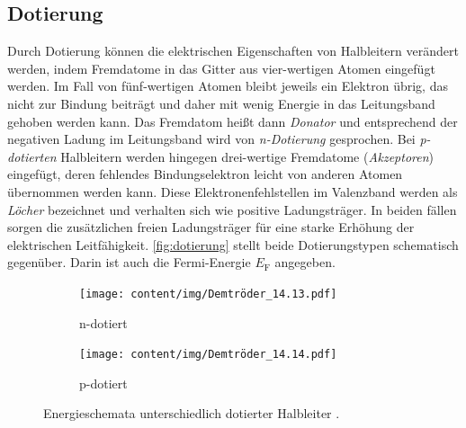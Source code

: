 \subsection{Dotierung}
Durch Dotierung können die elektrischen Eigenschaften von Halbleitern verändert werden,
indem Fremdatome in das Gitter aus vier-wertigen Atomen eingefügt werden.
Im Fall von fünf-wertigen Atomen %
bleibt jeweils ein Elektron übrig,
das nicht zur Bindung beiträgt und daher mit wenig Energie in das Leitungsband gehoben werden kann.
Das Fremdatom heißt dann \emph{Donator} und entsprechend der negativen Ladung im Leitungsband wird von \emph{n-Dotierung} gesprochen.
%
Bei \emph{p-dotierten} Halbleitern werden hingegen drei-wertige Fremdatome (\emph{Akzeptoren}) eingefügt,
deren fehlendes Bindungselektron leicht von anderen Atomen übernommen werden kann.
Diese Elektronenfehlstellen im Valenzband werden als \emph{Löcher} bezeichnet und verhalten sich wie positive Ladungsträger.
%
In beiden fällen sorgen die zusätzlichen freien Ladungsträger für eine starke Erhöhung der elektrischen Leitfähigkeit.
\autoref{fig:dotierung} stellt beide Dotierungstypen schematisch gegenüber.
Darin ist auch die Fermi-Energie $E_\text{F}$ angegeben.

\begin{figure}
    \centering
    \begin{subfigure}{0.48\textwidth}
        \centering
        \texttt{[image: content/img/Demtröder\_14.13.pdf]}
        \caption{n-dotiert}
        \label{fig:dotierung:donatoren}
    \end{subfigure}
    \hfill
    \begin{subfigure}{0.48\textwidth}
        \centering
        \texttt{[image: content/img/Demtröder\_14.14.pdf]}
        \caption{p-dotiert}
        \label{fig:dotierung:akzeptoren}
    \end{subfigure}
    \caption{Energieschemata unterschiedlich dotierter Halbleiter \cite{demtroeder}.}
    \label{fig:dotierung}
\end{figure}


